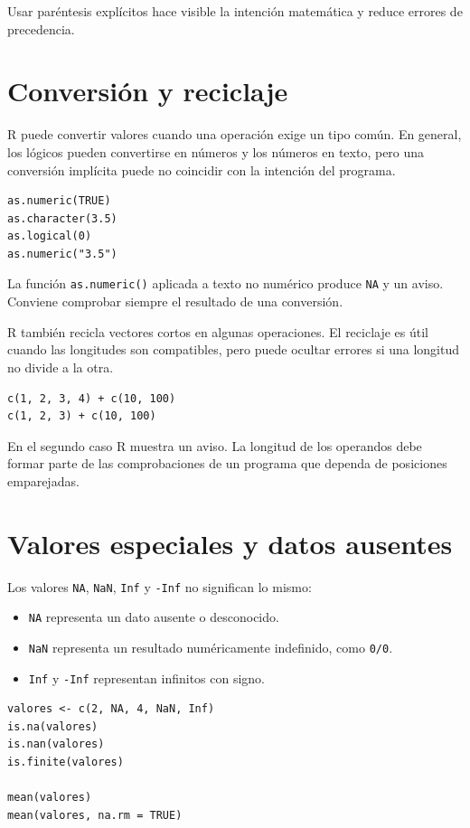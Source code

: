 \documentclass[11pt,a4paper,oneside]{book}
\begin{document}
Usar paréntesis explícitos hace visible la intención matemática y reduce errores de precedencia.

\section{Conversión y reciclaje}
R puede convertir valores cuando una operación exige un tipo común. En general, los lógicos pueden convertirse en números y los números en texto, pero una conversión implícita puede no coincidir con la intención del programa.

\begin{lstlisting}[style=rstyle]
as.numeric(TRUE)
as.character(3.5)
as.logical(0)
as.numeric("3.5")
\end{lstlisting}

La función \texttt{as.numeric()} aplicada a texto no numérico produce \texttt{NA} y un aviso. Conviene comprobar siempre el resultado de una conversión.

R también recicla vectores cortos en algunas operaciones. El reciclaje es útil cuando las longitudes son compatibles, pero puede ocultar errores si una longitud no divide a la otra.

\begin{lstlisting}[style=rstyle]
c(1, 2, 3, 4) + c(10, 100)
c(1, 2, 3) + c(10, 100)
\end{lstlisting}

En el segundo caso R muestra un aviso. La longitud de los operandos debe formar parte de las comprobaciones de un programa que dependa de posiciones emparejadas.

\section{Valores especiales y datos ausentes}
Los valores \texttt{NA}, \texttt{NaN}, \texttt{Inf} y \texttt{-Inf} no significan lo mismo:
\begin{itemize}
  \item \texttt{NA} representa un dato ausente o desconocido.
  \item \texttt{NaN} representa un resultado numéricamente indefinido, como \texttt{0/0}.
  \item \texttt{Inf} y \texttt{-Inf} representan infinitos con signo.
\end{itemize}

\begin{lstlisting}[style=rstyle]
valores <- c(2, NA, 4, NaN, Inf)
is.na(valores)
is.nan(valores)
is.finite(valores)

mean(valores)
mean(valores, na.rm = TRUE)
\end{lstlisting}
\end{document}
